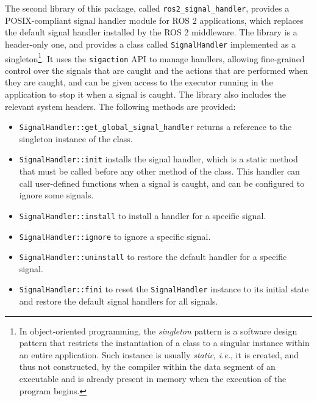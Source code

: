 The second library of this package, called \texttt{ros2\_signal\_handler}, provides a POSIX-compliant signal handler module for ROS 2 applications, which replaces the default signal handler installed by the ROS 2 middleware. The library is a header-only one, and provides a class called \texttt{SignalHandler} implemented as a singleton\footnote{In object-oriented programming, the \emph{singleton} pattern is a software design pattern \cite{freeman_head_2020} that restricts the instantiation of a class to a singular instance within an entire application. Such instance is usually \emph{static}, \emph{i.e.}, it is created, and thus not constructed, by the compiler within the data segment of an executable and is already present in memory when the execution of the program begins.}. It uses the \texttt{sigaction} API to manage handlers, allowing fine-grained control over the signals that are caught and the actions that are performed when they are caught, and can be given access to the executor running in the application to stop it when a signal is caught. The library also includes the relevant system headers. The following methods are provided:
\begin{itemize}
  \item \texttt{SignalHandler::get\_global\_signal\_handler} returns a reference to the singleton instance of the class.
  \item \texttt{SignalHandler::init} installs the signal handler, which is a static method that must be called before any other method of the class. This handler can call user-defined functions when a signal is caught, and can be configured to ignore some signals.
  \item \texttt{SignalHandler::install} to install a handler for a specific signal.
  \item \texttt{SignalHandler::ignore} to ignore a specific signal.
  \item \texttt{SignalHandler::uninstall} to restore the default handler for a specific signal.
  \item \texttt{SignalHandler::fini} to reset the \texttt{SignalHandler} instance to its initial state and restore the default signal handlers for all signals.
\end{itemize}

